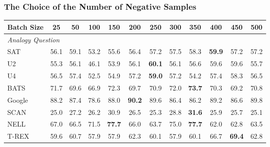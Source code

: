 \documentclass[3p]{elsarticle}
\begin{document}
{\subsubsection{The Choice of the Number of Negative Samples}
\label{sec:the-choice-of-negative-samples}
\begin{table}[!t]
\centering
\begin{tabular}{lccccccccccc}
\toprule
Batch Size &   25  &            50  &            100 &            150 &            200 &            250 &            300 &            350 &            400  & 450 & 500\\
\midrule
\multicolumn{4}{l}{\textit{Analogy Question}}                                \\
SAT               &  56.1 &           59.1 &           53.2 &           55.6 &           56.4 &           57.2 &           57.5 &           58.3 &  \textbf{59.9} &           57.2 &           57.2 \\
U2                &  55.3 &           56.1 &           46.1 &           53.9 &           56.1 &  \textbf{60.1} &           56.1 &           56.6 &           59.6 &           59.6 &           55.7 \\
U4                &  56.5 &           57.4 &           52.5 &           54.9 &           57.2 &  \textbf{59.0} &           57.2 &           54.2 &           57.4 &           58.3 &           56.5 \\
BATS              &  71.7 &           69.6 &           66.9 &           72.3 &           69.7 &           70.9 &           72.0 &  \textbf{73.7} &           70.3 &           69.2 &           70.8 \\
Google            &  88.2 &           87.4 &           78.6 &           88.0 &  \textbf{90.2} &           89.6 &           86.4 &           86.2 &           89.2 &           86.6 &           89.8 \\
SCAN              &  25.0 &           27.2 &           26.2 &           30.9 &           26.5 &           25.3 &           28.8 &  \textbf{31.6} &           25.9 &           25.7 &           25.1 \\
NELL              &  67.0 &           66.5 &           71.5 &  \textbf{77.7} &           66.0 &           63.7 &           75.0 &  \textbf{77.7} &           62.0 &           62.8 &           63.5 \\
T-REX             &  59.6 &           60.7 &           57.9 &           57.9 &           62.3 &           60.1 &           57.9 &           60.1 &           66.7 &  \textbf{69.4} &           62.8 \\

\end{tabular}
\end{table}}
\end{document}
